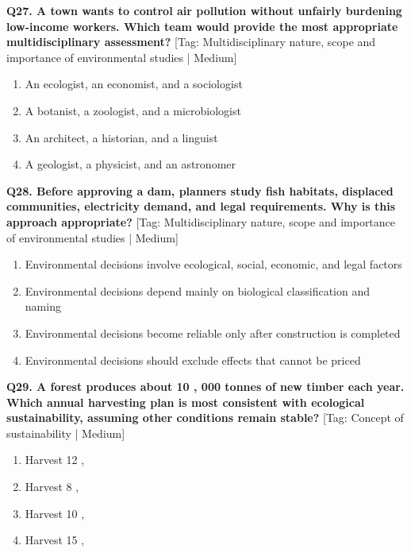 \noindent\textbf{Q27. A town wants to control air pollution without unfairly burdening low-income workers. Which team would provide the most appropriate multidisciplinary assessment?} \hfill [Tag: Multidisciplinary nature, scope and importance of environmental studies | Medium]
\begin{enumerate}[label=(\alph*),topsep=2pt,itemsep=1pt,partopsep=0pt,parsep=0pt]
    \item {An ecologist, an economist, and a sociologist}
    \item {A botanist, a zoologist, and a microbiologist}
    \item {An architect, a historian, and a linguist}
    \item {A geologist, a physicist, and an astronomer}
\end{enumerate}
\vspace{2mm}

\noindent\textbf{Q28. Before approving a dam, planners study fish habitats, displaced communities, electricity demand, and legal requirements. Why is this approach appropriate?} \hfill [Tag: Multidisciplinary nature, scope and importance of environmental studies | Medium]
\begin{enumerate}[label=(\alph*),topsep=2pt,itemsep=1pt,partopsep=0pt,parsep=0pt]
    \item {Environmental decisions involve ecological, social, economic, and legal factors}
    \item {Environmental decisions depend mainly on biological classification and naming}
    \item {Environmental decisions become reliable only after construction is completed}
    \item {Environmental decisions should exclude effects that cannot be priced}
\end{enumerate}
\vspace{2mm}

\noindent\textbf{Q29. A forest produces about 10 , 000 tonnes of new timber each year. Which annual harvesting plan is most consistent with ecological sustainability, assuming other conditions remain stable?} \hfill [Tag: Concept of sustainability | Medium]
\begin{enumerate}[label=(\alph*),topsep=2pt,itemsep=1pt,partopsep=0pt,parsep=0pt]
    \item {Harvest 12 ,}
    \item {Harvest 8 ,}
    \item {Harvest 10 ,}
    \item {Harvest 15 ,}
\end{enumerate}
\vspace{2mm}


